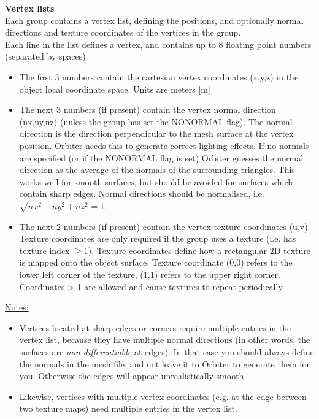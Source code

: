 \documentclass[Orbiter Developer Manual.tex]{subfiles}
\begin{document}
\noindent
\textbf{Vertex lists}\\
Each group contains a vertex list, defining the positions, and optionally normal directions and texture coordinates of the vertices in the group.\\
Each line in the list defines a vertex, and contains up to 8 floating point numbers (separated by spaces)

\begin{itemize}
\item The first 3 numbers contain the cartesian vertex coordinates (x,y,z) in the object local coordinate space. Units are meters [m]
\item The next 3 numbers (if present) contain the vertex normal direction (nx,ny,nz) (unless the group has set the NONORMAL flag). The normal direction is the direction perpendicular to the mesh surface at the vertex position. Orbiter needs this to generate correct lighting effects. If no normals are specified (or if the NONORMAL flag is set) Orbiter guesses the normal direction as the average of the normals of the surrounding triangles. This works well for smooth surfaces, but should be avoided for surfaces which contain sharp edges. Normal directions should be normalised, i.e. $\sqrt{nx^{2}+ny^{2}+nz^{2}} = 1$.
\item The next 2 numbers (if present) contain the vertex texture coordinates (u,v). Texture coordinates are only required if the group uses a texture (i.e. has texture index $\geq 1$). Texture coordinates define how a rectangular 2D texture is mapped onto the object surface. Texture coordinate (0,0) refers to the lower left corner of the texture, (1,1) refers to the upper right corner. Coordinates > 1 are allowed and cause textures to repeat periodically.
\end{itemize}

\noindent
\underline{Notes:}

\begin{itemize}
\item Vertices located at sharp edges or corners require multiple entries in the vertex list, because they have multiple normal directions (in other words, the surfaces are \textit{non-differentiable} at edges). In that case you should always define the normals in the mesh file, and not leave it to Orbiter to generate them for you. Otherwise the edges will appear unrealistically smooth.
\item Likewise, vertices with multiple vertex coordinates (e.g. at the edge between two texture maps) need multiple entries in the vertex list.
\end{itemize}
\end{document}
